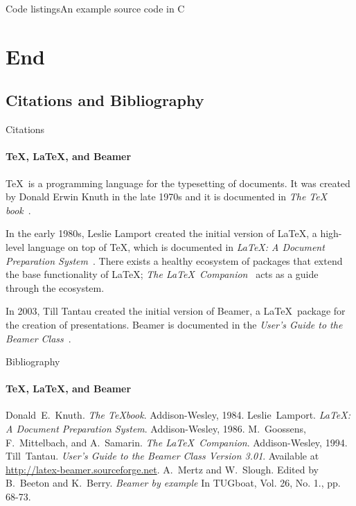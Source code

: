 \documentclass[compress]{beamer}
\begin{document}
\begin{frame}{Code listings}{An example source code in C}
\sleepSort
\end{frame}

\section{End}

\subsection{Citations and Bibliography}

\begin{frame}[label=citations]{Citations}
\framesubtitle{\TeX, \LaTeX, and Beamer}

\justifying\TeX\ is a programming language for the typesetting
of documents. It was created by Donald Erwin Knuth in the late
1970s and it is documented in \emph{The \TeX
book}~\cite{knuth84}.

In the early 1980s, Leslie Lamport created the initial version
of \LaTeX, a high-level language on top of \TeX, which is
documented in \emph{\LaTeX : A Document Preparation
System}~\cite{lamport94}. There exists a healthy ecosystem of
packages that extend the base functionality of \LaTeX;
\emph{The \LaTeX\ Companion}~\cite{MG94} acts as a guide
through the ecosystem.

In 2003, Till Tantau created the initial version of Beamer, a
\LaTeX\ package for the creation of presentations. Beamer is
documented in the \emph{User's Guide to the Beamer
Class}~\cite{tantau04}.
\end{frame}

\begin{frame}[label=bibliography]{Bibliography}
\framesubtitle{\TeX, \LaTeX, and Beamer}
\begin{thebibliography}{9}
Donald~E.~Knuth.
\emph{The \TeX book}.
Addison-Wesley, 1984.
Leslie~Lamport.
\emph{\LaTeX : A Document Preparation System}.
Addison-Wesley, 1986.
M.~Goossens, F.~Mittelbach, and A.~Samarin.
\emph{The \LaTeX\ Companion}.
Addison-Wesley, 1994.
Till~Tantau.
\emph{User's Guide to the Beamer Class Version 3.01}.
Available at \url{http://latex-beamer.sourceforge.net}.
A.~Mertz and W.~Slough.
Edited by B.~Beeton and K.~Berry.
\emph{Beamer by example} In TUGboat,
Vol. 26, No. 1., pp. 68-73.
\end{thebibliography}
\end{frame}
\end{document}
